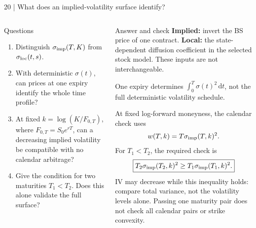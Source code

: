 \documentclass[handout,10pt,t,aspectratio=169]{beamer}
\newcommand{\dd}{\,\mathrm d}
\newenvironment{questions}{\begin{block}{Questions}}{\end{block}}
\newenvironment{answers}{\begin{exampleblock}{Answer and check}}{\end{exampleblock}}
\newcommand{\compact}{\small%
 \setlength{\abovedisplayskip}{3pt}%
 \setlength{\belowdisplayskip}{3pt}%
 \setlength{\abovedisplayshortskip}{2pt}%
 \setlength{\belowdisplayshortskip}{2pt}%
 \setlength{\parskip}{2pt}}
\begin{document}
\begin{frame}{20 | What does an implied-volatility surface identify?}
\compact
\begin{columns}[T,onlytextwidth]
\begin{questions}
\begin{enumerate}
\item Distinguish \(\sigma_{\rm imp}(T,K)\) from \(\sigma_{\rm loc}(t,s)\).
\item With deterministic \(\sigma(t)\), can prices at one expiry identify the
whole time profile?
\item At fixed \(k=\log(K/F_{0,T})\), where \(F_{0,T}=S_0e^{rT}\),
can a decreasing implied volatility be compatible with no calendar arbitrage?
\item Give the condition for two maturities \(T_1<T_2\).
Does this alone validate the full surface?
\end{enumerate}
\end{questions}
\begin{answers}
\textbf{Implied:} invert the BS price of one contract.
\textbf{Local:} the state-dependent diffusion coefficient in the selected
stock model. These inputs are not interchangeable.

One expiry determines \(\int_0^T\sigma(t)^2\dd t\), not the full deterministic
volatility schedule.

At fixed log-forward moneyness, the calendar check uses
\[
 w(T,k)=T\sigma_{\rm imp}(T,k)^2.
\]
For \(T_1<T_2\), the required check is
\[
 \boxed{T_2\sigma_{\rm imp}(T_2,k)^2\geq
 T_1\sigma_{\rm imp}(T_1,k)^2.}
\]
IV may decrease while this inequality holds: compare total variance,
not the volatility levels alone. Passing one maturity pair does not check
all calendar pairs or strike convexity.
\end{answers}
\end{columns}
\end{frame}
\end{document}
